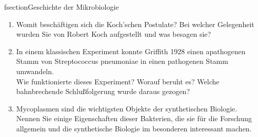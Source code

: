 fsection{Geschichte der Mikrobiologie}
	\begin{enumerate}
		\item Womit beschäftigen sich die Koch’schen Postulate? Bei welcher Gelegenheit wurden Sie von Robert Koch aufgestellt und was besagen sie? \hfill \vspace{4mm}
		\item In einem klassischen Experiment konnte Griffith 1928 einen apathogenen Stamm von Streptococcus pneumoniae in einen pathogenen Stamm umwandeln.\\
			Wie funktionierte dieses Experiment? Worauf beruht es? Welche bahnbrechende Schlußfolgerung wurde daraus gezogen? \hfill \vspace{4mm}
		\item Mycoplasmen sind die wichtigsten Objekte der synthetischen Biologie. Nennen Sie einige Eigenschaften dieser Bakterien, die sie für die Forschung allgemein und die synthetische Biologie im besonderen interessant machen. \hfill \vspace{4mm}
	\end{enumerate}

